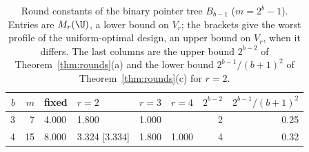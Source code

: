 \begin{table}[h]
\centering
\caption{Round constants of the binary pointer tree $B_{b-1}$ ($m=2^b-1$). Entries are $M_r(\U)$, a lower bound on $V_r$; the brackets give the worst profile of the uniform-optimal design, an upper bound on $V_r$, when it differs. The last columns are the upper bound $2^{b-2}$ of Theorem~\ref{thm:rounds}(a) and the lower bound $2^{b-1}/(b+1)^2$ of Theorem~\ref{thm:rounds}(c) for $r=2$.}
\label{tab:pointer}
\small
\begin{tabular}{rrllllrr}
\toprule
$b$ & $m$ & fixed & $r=2$ & $r=3$ & $r=4$ & $2^{b-2}$ & $2^{b-1}/(b+1)^2$ \\
\midrule
3 & 7 & 4.000 & 1.800 & 1.000 &  & 2 & 0.25 \\
4 & 15 & 8.000 & 3.324 [3.334] & 1.800 & 1.000 & 4 & 0.32 \\
\bottomrule
\end{tabular}
\end{table}
